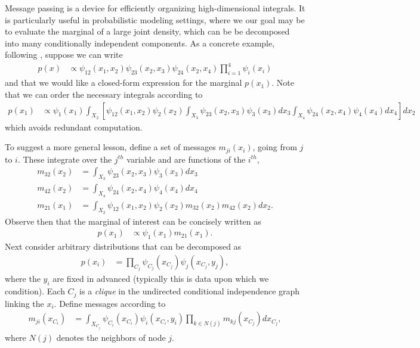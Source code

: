 \documentclass[14pt]{extarticle}
\begin{document}
Message passing is a device for efficiently organizing high-dimensional
integrals. It is particularly useful in probabilistic modeling settings, where
we our goal may be to evaluate the marginal of a large joint density, which can
be be decomposed into many conditionally independent components. As a concrete
example, following \cite{fox2009bayesian}, suppose we can write
\begin{align*}
p\left(x\right) &\propto \psi_{12}\left(x_1, x_2\right)\psi_{23}\left(x_2, x_3\right)\psi_{24}\left(x_2, x_4\right) \prod_{i = 1}^{4}\psi_{i}\left(x_i\right)
\end{align*}
and that we would like a closed-form expression for the marginal
$p\left(x_1\right)$. Note that we can order the necessary integrals according to
\begin{align*}
  p\left(x_1\right) &\propto \psi_1\left(x_1\right)
  \int_{X_2}\left[\psi_{12}\left(x_1, x_2\right)\psi_2\left(x_2\right)
    \int_{X_3} \psi_{23}\left(x_2, x_3\right) \psi_3\left(x_3\right) dx_3
    \int_{X_4} \psi_{24}\left(x_2, x_4\right)\psi_4\left(x_4\right) dx_4
    \right] dx_2
\end{align*}
which avoids redundant computation.

To suggest a more general lesson, define a set of messages
$m_{ji}\left(x_i\right)$, going from $j$ to $i$. These integrate over the
$j^{th}$ variable and are functions of the $i^{th}$,
\begin{align*}
  m_{32}\left(x_2\right) &= \int_{X_3} \psi_{23}\left(x_2, x_3\right)\psi_3\left(x_3\right) dx_3 \\
  m_{42}\left(x_2\right) &= \int_{X_4} \psi_{24}\left(x_2, x_4\right)\psi_4\left(x_4\right) dx_4 \\
  m_{21}\left(x_1\right) &= \int_{X_2} \psi_{12}\left(x_1, x_2\right) \psi_2\left(x_2\right) m_{32}\left(x_2\right) m_{42}\left(x_2\right) dx_2.
\end{align*}
Observe then that the marginal of interest can be concisely written as
\begin{align}
  \label{eq:message_passing_example}
  p\left(x_1\right) &\propto \psi_1\left(x_1\right) m_{21}\left(x_1\right).
\end{align}
Next consider arbitrary distributions that can be decomposed as
\begin{align*}
  p\left(x_i\right) &= \prod_{C_j} \psi_{C_j}\left(x_{C_j}\right)\psi_{j}\left(x_{C_j}, y_{j}\right),
\end{align*}
where the $y_i$ are fixed in advanced (typically this is data upon which we
condition). Each $C_j$ is a \textit{clique} in the undirected conditional
independence graph linking the $x_i$. Define messages according to
\begin{align*}
  m_{ji}\left(x_{C_i}\right) &= \int_{X_{C_{j}}} \psi_{C_i}\left(x_{C_{i}}\right) \psi_{i}\left(x_{C_{i}}, y_{i}\right) \prod_{k \in N\left(j\right)} m_{kj}\left(x_{C_{j}}\right) dx_{C_{j}},
\end{align*}
where $N\left(j\right)$ denotes the neighbors of node $j$.
\end{document}
